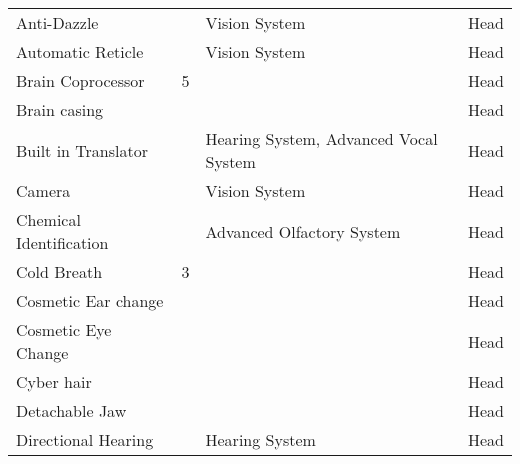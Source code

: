 \documentclass[twoside]{book}
\begin{document}
\begin{longtable}{p{1.25in}p{2em}ll}
  \raggedright
           Anti-Dazzle 
  &
  
  &
   Vision System 
  &
   Head 
  \tabularnewline
      
  \raggedright
           Automatic Reticle 
  &
  
  &
   Vision System 
  &
   Head 
  \tabularnewline
      
  \raggedright
           Brain Coprocessor 
  &
   5 
  &
  
  &
   Head 
  \tabularnewline
      
  \raggedright
           Brain casing 
  &
  
  &
  
  &
   Head 
  \tabularnewline
      
  \raggedright
           Built in Translator 
  &
  
  &
   Hearing System,
           Advanced Vocal System 
  &
   Head 
  \tabularnewline
      
  \raggedright
           Camera 
  &
  
  &
   Vision System 
  &
   Head 
  \tabularnewline
      
  \raggedright
           Chemical Identification
           
  &
  
  &
   Advanced Olfactory
           System 
  &
   Head 
  \tabularnewline
      
  \raggedright
           Cold Breath 
  &
   3 
  &
  
  &
   Head 
  \tabularnewline
      
  \raggedright
           Cosmetic Ear change 
  &
  
  &
  
  &
   Head 
  \tabularnewline
      
  \raggedright
           Cosmetic Eye Change 
  &
  
  &
  
  &
   Head 
  \tabularnewline
      
  \raggedright
           Cyber hair 
  &
  
  &
  
  &
   Head 
  \tabularnewline
      
  \raggedright
           Detachable Jaw 
  &
  
  &
  
  &
   Head 
  \tabularnewline
      
  \raggedright
           Directional Hearing 
  &
  
  &
   Hearing System 
  &
   Head 
  \tabularnewline
      

\end{longtable}
\end{document}
